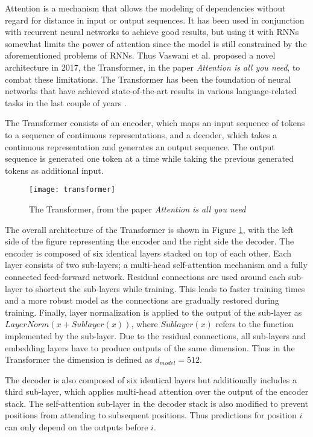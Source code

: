 Attention is a mechanism that allows the modeling of dependencies without regard for distance in input or output sequences.
It has been used in conjunction with recurrent neural networks to achieve good results, but using it with RNNs somewhat limits the power of attention since the model is still constrained by the aforementioned problems of RNNs.
Thus Vaswani et al. proposed a novel architecture in 2017, the Transformer, in the paper \textit{Attention is all you need}, to combat these limitations.
The Transformer has been the foundation of neural networks that have achieved state-of-the-art results in various language-related tasks in the last couple of years \cite{vaswani2017}.

The Transformer consists of an encoder, which maps an input sequence of tokens to a sequence of continuous representations, and a decoder, which takes a continuous representation and generates an output sequence.
The output sequence is generated one token at a time while taking the previous generated tokens as additional input.

\begin{figure}[t]
\texttt{[image: transformer]}
\centering
\caption{The Transformer, from the paper \textit{Attention is all you need} \cite{vaswani2017}}
\label{fig:transformer}
\end{figure}

The overall architecture of the Transformer is shown in Figure \ref{fig:transformer}, with the left side of the figure representing the encoder and the right side the decoder.
The encoder is composed of six identical layers stacked on top of each other.
Each layer consists of two sub-layers; a multi-head self-attention mechanism and a fully connected feed-forward network.
Residual connections \cite{he2016} are used around each sub-layer to shortcut the sub-layers while training.
This leads to faster training times and a more robust model as the connections are gradually restored during training.
Finally, layer normalization is applied to the output of the sub-layer as $LayerNorm(x+Sublayer(x))$, where $Sublayer(x)$ refers to the function implemented by the sub-layer.
Due to the residual connections, all sub-layers and embedding layers have to produce outputs of the same dimension.
Thus in the Transformer the dimension is defined as $d_{model}=512$.

The decoder is also composed of six identical layers but additionally includes a third sub-layer, which applies multi-head attention over the output of the encoder stack.
The self-attention sub-layer in the decoder stack is also modified to prevent positions from attending to subsequent positions.
Thus predictions for position $i$ can only depend on the outputs before $i$.

